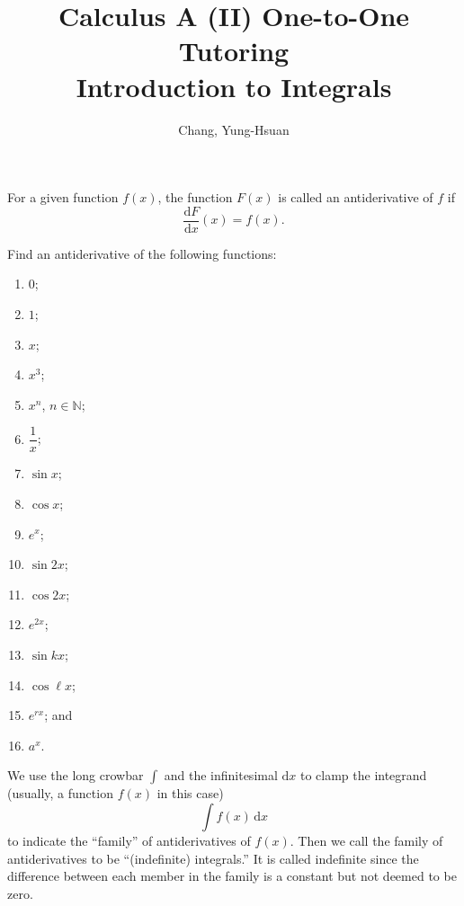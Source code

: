 \documentclass[11pt]{article}
\title{\textbf{Calculus A (II) One-to-One Tutoring}\\ \Large Introduction to Integrals}
\author{Chang, Yung-Hsuan}
\theoremstyle{break}
\theoremstyle{no_label}
\newcommand{\derivative}[2]{\dfrac{\dd{#1}}{\dd{#2}}}
\newcommand{\dd}{\text{d}}
\newcommand{\ddi}{\text{$\,$d}}
\newcommand{\bbN}{\mathbb{N}}
\numberwithin{equation}{theorem}
\begin{document}
\maketitle

\begin{definition}[Antiderivative]
    For a given function $f(x)$, the function $F(x)$ is called an antiderivative of $f$ if $$\derivative{F}{x}(x)=f(x).$$
\end{definition}

\begin{example}
    Find an antiderivative of the following functions: \vspace{-1em}
    \begin{multicols}{4}
        \begin{enumerate}
            \item $0$;
            \item $1$;
            \item $x$;
            \item $x^3$;
            \item $x^n$, $n\in\bbN$;
            \item $\dfrac{1}{x}$;
            \item $\sin x$;
            \item $\cos x$;
            \item $e^x$;
            \item $\sin 2x$;
            \item $\cos 2x$;
            \item $e^{2x}$;
            \item $\sin kx$;
            \item $\cos \ell x$;
            \item $e^{rx}$; and
            \item $a^x$.
        \end{enumerate}
    \end{multicols}
\end{example}
\newpage

\begin{remark}
    We use the long crowbar $\int$ and the infinitesimal $\dd x$ to clamp the integrand (usually, a function $f(x)$ in this case) $$\int f(x)\ddi x$$ to indicate the ``family'' of antiderivatives of $f(x)$. Then we call the family of antiderivatives to be ``(indefinite) integrals.'' It is called indefinite since the difference between each member in the family is a constant but not deemed to be zero.
\end{remark}
\end{document}
